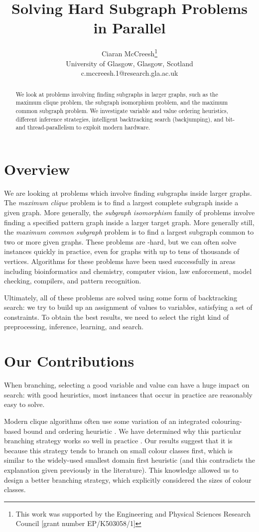 \documentclass[letterpaper]{article}
\title{Solving Hard Subgraph Problems in Parallel}
\author{Ciaran McCreesh\thanks{This work was supported by the Engineering and Physical Sciences
Research Council [grant number EP/K503058/1]} \\
University of Glasgow, Glasgow, Scotland \\ c.mccreesh.1@research.gla.ac.uk}
\begin{document}
\maketitle

\begin{abstract}
    We look at problems involving finding subgraphs in larger graphs, such as the maximum clique
    problem, the subgraph isomorphism problem, and the maximum common subgraph problem. We
    investigate variable and value ordering heuristics, different inference strategies, intelligent
    backtracking search (backjumping), and bit- and thread-parallelism to exploit modern hardware.
\end{abstract}

\section{Overview}

We are looking at problems which involve finding subgraphs inside larger graphs. The \emph{maximum
clique} problem  is to find a largest complete subgraph inside a given graph. More generally, the
\emph{subgraph isomorphism} family of problems involve finding a specified pattern graph
inside a larger target graph. More generally still, the \emph{maximum common subgraph}
problem is to find a largest subgraph common to two or more given graphs.
These problems are \NP-hard, but we can often solve instances quickly in practice, even for graphs
with up to tens of thousands of vertices. Algorithms for these problems have been used successfully
in areas including bioinformatics and chemistry, computer vision, law enforcement, model checking,
compilers, and pattern recognition.

Ultimately, all of these problems are solved using some form of backtracking search: we try to build
up an assignment of values to variables, satisfying a set of constraints. To obtain the best
results, we need to select the right kind of preprocessing, inference, learning, and search.

\section{Our Contributions}

When branching, selecting a good variable and value can have a huge impact on search: with good
heuristics, most instances that occur in practice are reasonably easy to solve.

Modern clique algorithms often use some variation of an integrated colouring-based bound and
ordering heuristic \cite{Tomita:2010}. We have determined why this particular branching strategy
works so well in practice \cite{cp/McCreeshP14}. Our results suggest that it is because this
strategy tends to branch on small colour classes first, which is similar to the widely-used smallest
domain first heuristic (and this contradicts the explanation given previously in the literature).
This knowledge allowed us to design a better branching strategy, which explicitly considered the
sizes of colour classes.
\end{document}
